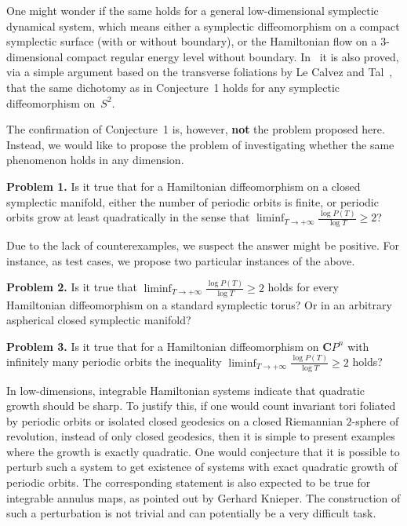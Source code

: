 \documentclass[11pt]{article}
\theoremstyle{definition}
\begin{document}
One might wonder if the same holds for a general low-dimensional symplectic dynamical system, which means either a symplectic diffeomorphism on a compact symplectic surface (with or without boundary), or the Hamiltonian flow on a $3$-dimensional compact regular energy level without boundary. In~\cite{Albach} it is also proved, via a simple argument based on the transverse foliations by Le Calvez and Tal~\cite{LeCalvez-Tal}, that the same dichotomy as in Conjecture~1 holds for any symplectic diffeomorphism on~$S^2$.

The confirmation of Conjecture~1 is, however, \textbf{not} the problem proposed here. Instead, we would like to propose the problem of investigating whether the same phenomenon holds in any dimension. 

\noindent \textbf{Problem 1.} Is it true that for a Hamiltonian diffeomorphism on a closed symplectic manifold, either the number of periodic orbits is finite, or periodic orbits grow at least quadratically in the sense that $\liminf_{T\to+\infty} \frac{\log P(T)}{\log T} \geq 2$?

Due to the lack of counterexamples, we suspect the answer might be positive. For instance, as test cases, we propose two particular instances of the above.

\noindent \textbf{Problem 2.} Is it true that $\liminf_{T\to+\infty} \frac{\log P(T)}{\log T} \geq 2$ holds for every Hamiltonian diffeomorphism on a standard symplectic torus? Or in an arbitrary aspherical closed symplectic manifold?

\noindent \textbf{Problem 3.} Is it true that for a Hamiltonian diffeomorphism on $\mathbf{C}P^n$ with infinitely many periodic orbits the inequality $\liminf_{T\to+\infty} \frac{\log P(T)}{\log T} \geq 2$ holds?

In low-dimensions, integrable Hamiltonian systems indicate that quadratic growth should be sharp. To justify this, if one would count invariant tori foliated by periodic orbits or isolated closed geodesics on a closed Riemannian $2$-sphere of revolution, instead of only closed geodesics, then it is simple to present examples where the growth is exactly quadratic. One would conjecture that it is possible to perturb such a system to get existence of systems with exact quadratic growth of periodic orbits. The corresponding statement is also expected to be true for integrable annulus maps, as pointed out by Gerhard Knieper. The construction of such a perturbation is not trivial and can potentially be a very difficult task.
\end{document}
